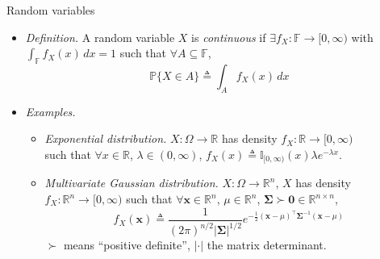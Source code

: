 \documentclass{beamer}
\numberwithin{equation}{section}
\begin{document}
\begin{frame}{Random variables}
    \begin{itemize}
        \item
        \textit{Definition.} A random variable $ X $ is \textit{continuous} if
        $ \exists f_X : \mathbb{F} \rightarrow [0, \infty) $ with
        $ \int_\mathbb{F}f_X(x)\,dx = 1 $ such that $ \forall A \subseteq
        \mathbb{F} $,
        \begin{equation*}
            \mathbb{P}\{X \in A\} \triangleq \int_Af_X(x)\,dx
        \end{equation*}

        \vspace{-5 pt}

        \item
        \textit{Examples.}
        \begin{itemize}
            \item
            \textit{Exponential distribution.}
            $ X : \Omega \rightarrow \mathbb{R} $ has density
            $ f_X : \mathbb{R} \rightarrow [0, \infty) $ \\ such that
            $ \forall x \in \mathbb{R} $, $ \lambda \in (0, \infty) $,
            $ f_X(x) \triangleq \mathbb{I}_{[0, \infty)}(x)
            \lambda e^{-\lambda x} $.

            \item
            \textit{Multivariate Gaussian distribution.}
            $ X : \Omega \rightarrow \mathbb{R}^n $, $ X $ has density
            $ f_X : \mathbb{R}^n \rightarrow [0, \infty) $ such that
            $ \forall \mathbf{x} \in \mathbb{R}^n $, $ \mu \in \mathbb{R}^n $,
            $ \mathbf{\Sigma} \succ \mathbf{0} \in \mathbb{R}^{n \times n} $,
            \begin{equation*}
                f_X(\mathbf{x}) \triangleq
                \frac{1}{(2\pi)^{n / 2}|\mathbf{\Sigma}|^{1 / 2}}
                e^{
                    -\frac{1}{2}(\mathbf{x} - \mu)^\top\mathbf{\Sigma}^{-1}
                    (\mathbf{x} - \mu)
                }
            \end{equation*}
            $ \succ $ means ``positive definite'', $ |\cdot| $ the matrix
            determinant.
        \end{itemize}
    \end{itemize}
\end{frame}
\end{document}

